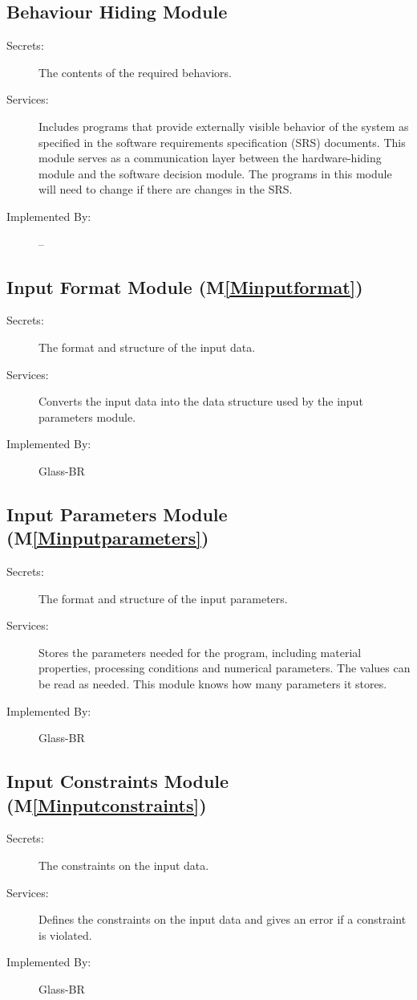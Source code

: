 \documentclass[12pt]{article}
\begin{document}
\subsection{Behaviour Hiding Module}
\label{Sec:BHM}
\begin{description}
\item[Secrets:]The contents of the required behaviors.
\item[Services:]Includes programs that provide externally visible behavior of the system as specified in the software requirements specification (SRS) documents. This module serves as a communication layer between the hardware-hiding module and the software decision module. The programs in this module will need to change if there are changes in the SRS.
\item[Implemented By:]--
\end{description}
\subsection{Input Format Module (M\ref{Minputformat})}
\label{Sec:IFM()}
\begin{description}
\item[Secrets:]The format and structure of the input data.
\item[Services:]Converts the input data into the data structure used by the input parameters module.
\item[Implemented By:]Glass-BR
\end{description}
\subsection{Input Parameters Module (M\ref{Minputparameters})}
\label{Sec:IPM()}
\begin{description}
\item[Secrets:]The format and structure of the input parameters.
\item[Services:]Stores the parameters needed for the program, including material properties, processing conditions and numerical parameters. The values can be read as needed. This module knows how many parameters it stores.
\item[Implemented By:]Glass-BR
\end{description}
\subsection{Input Constraints Module (M\ref{Minputconstraints})}
\label{Sec:ICM()}
\begin{description}
\item[Secrets:]The constraints on the input data.
\item[Services:]Defines the constraints on the input data and gives an error if a constraint is violated.
\item[Implemented By:]Glass-BR
\end{description}
\end{document}
